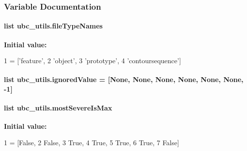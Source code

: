 \subsubsection{Variable Documentation}
\hypertarget{namespaceubc__utils_a0316c895833fa377630ae2a6dc71abdb}{
\paragraph[{file\-Type\-Names}]{\setlength{\rightskip}{0pt plus 5cm}list ubc\-\_\-utils.\-file\-Type\-Names}}\label{namespaceubc__utils_a0316c895833fa377630ae2a6dc71abdb}
{\bfseries Initial value\-:}
\begin{DoxyCode}
1 = [\textcolor{stringliteral}{'feature'},
2                  \textcolor{stringliteral}{'object'},
3                  \textcolor{stringliteral}{'prototype'},
4                  \textcolor{stringliteral}{'contoursequence'}]
\end{DoxyCode}
\hypertarget{namespaceubc__utils_aa1bfdf04f7df283cda5d90b9f6d2d8aa}{
\paragraph[{ignored\-Value}]{\setlength{\rightskip}{0pt plus 5cm}list ubc\-\_\-utils.\-ignored\-Value = \mbox{[}None, None, None, None, None, None, -\/1\mbox{]}}}\label{namespaceubc__utils_aa1bfdf04f7df283cda5d90b9f6d2d8aa}
\hypertarget{namespaceubc__utils_a1cc8fc4e15a9d724f5a14bb4584b8623}{
\paragraph[{most\-Severe\-Is\-Max}]{\setlength{\rightskip}{0pt plus 5cm}list ubc\-\_\-utils.\-most\-Severe\-Is\-Max}}\label{namespaceubc__utils_a1cc8fc4e15a9d724f5a14bb4584b8623}
{\bfseries Initial value\-:}
\begin{DoxyCode}
1 = [\textcolor{keyword}{False}, 
2                    \textcolor{keyword}{False}, 
3                    \textcolor{keyword}{True}, 
4                    \textcolor{keyword}{True}, 
5                    \textcolor{keyword}{True}, 
6                    \textcolor{keyword}{True}, 
7                    \textcolor{keyword}{False}]
\end{DoxyCode}
